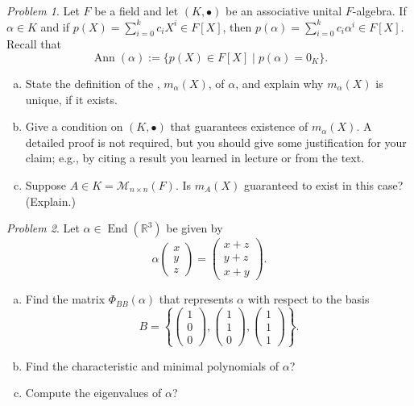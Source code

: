 \documentclass[11pt]{paper}
\theoremstyle{remark}
\newtheorem{problem}{Problem}
\newcommand{\<}{\ensuremath{\langle}}
\renewcommand{\>}{\ensuremath{\rangle}}
\newcommand\fld[1]{\ensuremath{\mathbb{#1}}}
\newcommand\R{\ensuremath{\fld{R}}}
\newcommand\Ann{\ensuremath{\operatorname{Ann}}}
\newcommand\End{\ensuremath{\operatorname{End}}}
\begin{document}
\probskip
\begin{problem}
Let $F$ be  a field and let $(K, \bullet)$ be an associative unital
$F$-algebra.  If $\alpha \in K$ and if $p(X) = \sum_{i=0}^k c_i X^i \in  F[X]$,
then $p(\alpha) = \sum_{i=0}^k c_i \alpha^i \in  F[X]$.  Recall that 
\[
\Ann(\alpha) := \{p(X) \in F[X] \mid p(\alpha) = 0_K\}.
\]
\begin{enumerate}[(a)]
\item State the definition of the , $m_\alpha(X)$, of
  $\alpha$, and explain why $m_\alpha(X)$ is unique, if it exists.
\item Give a condition on $(K, \bullet)$ that guarantees existence of 
 $m_\alpha(X)$. A detailed proof is not required, but you should give some
  justification for your claim; e.g., by citing a result you learned in
  lecture or from the text. 
\item Suppose $A \in K = \mathcal{M}_{n\times n}(F)$. Is $m_A(X)$ guaranteed to
  exist in this case? (Explain.)
\end{enumerate}
\end{problem}

\probskip
\begin{problem}
Let $\alpha\in \End(\R^3)$ be given by 
\[
\alpha 
\begin{pmatrix}
x \\  y \\ z
\end{pmatrix}
  = 
\begin{pmatrix}
x +z \\  y+z \\ x+y
\end{pmatrix}.
\]
\begin{enumerate}[(a)]
\item  Find the matrix $\Phi_{BB}(\alpha)$ that represents $\alpha$ with
  respect to the basis  
\[
B = \left\{ 
\begin{pmatrix}1 \\  0 \\ 0\end{pmatrix},
\begin{pmatrix}1 \\  1 \\ 0\end{pmatrix},
\begin{pmatrix}1 \\  1 \\ 1\end{pmatrix}\right\}.
\]
\item Find the characteristic and minimal polynomials of $\alpha$? 
\item Compute the eigenvalues of $\alpha$?
\end{enumerate}
\end{problem}
\end{document}
